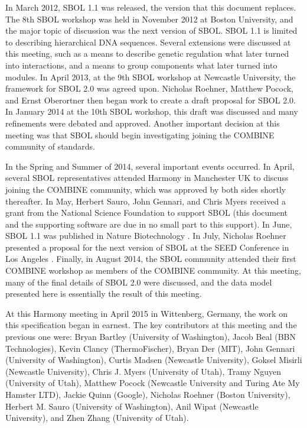 In March 2012, SBOL 1.1 was released, the version that this document replaces. The 8th SBOL workshop was held in November 2012 at Boston University, and the major topic of discussion was the next version of SBOL.  SBOL 1.1 is limited to describing hierarchical DNA sequences.  Several extensions were discussed at this meeting, such as a means to describe genetic regulation what later turned into interactions, and a means to group components what later turned into modules.  In April 2013, at the 9th SBOL workshop at Newcastle University, the framework for SBOL 2.0 was agreed upon.  Nicholas Roehner, Matthew Pocock, and Ernst Oberortner then began work to create a draft proposal for SBOL 2.0.  In January 2014 at the 10th SBOL workshop, this draft was discussed and many refinements were debated and approved.  Another important decision at this meeting was that SBOL should begin investigating joining the COMBINE community of standards.

In the Spring and Summer of 2014, several important events occurred.  In April, several SBOL representatives attended Harmony in Manchester UK to discuss joining the COMBINE community, which was approved by both sides shortly thereafter.  In May, Herbert Sauro, John Gennari, and Chris Myers received a grant from the National Science Foundation to support SBOL (this document and the supporting software are due in no small part to this support).  In June, SBOL 1.1 was published in Nature Biotechnology \cite{NBT}.  In July, Nicholas Roehner presented a proposal for the next version of SBOL at the SEED Conference in Los Angeles \cite{ACS}.  Finally, in August 2014, the SBOL community attended their first COMBINE workshop as members of the COMBINE community.  At this meeting, many of the final details of SBOL 2.0 were discussed, and the data model presented here is essentially the result of this meeting.

At this Harmony meeting in April 2015 in Wittenberg, Germany, the work on this specification began in earnest.  The key contributors at this meeting and the previous one were: Bryan Bartley (University of Washington), Jacob Beal (BBN Technologies), Kevin Clancy (ThermoFischer), Bryan Der (MIT), John Gennari (University of Washington), Curtis Madsen (Newcastle University), Goksel Misirli (Newcastle University), Chris J. Myers (University of Utah), Tramy Nguyen (University of Utah), Matthew Pocock (Newcastle University and Turing Ate My Hamster LTD), Jackie Quinn (Google), Nicholas Roehner (Boston University), Herbert M. Sauro (University of Washington), Anil Wipat (Newcastle University), and Zhen Zhang (University of Utah).


